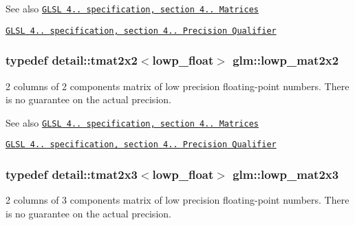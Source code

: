 \begin{DoxySeeAlso}{\-See also}
\href{http://www.opengl.org/registry/doc/GLSLangSpec.4.20.8.pdf}{\tt \-G\-L\-S\-L 4.. specification, section 4.. \-Matrices} 

\href{http://www.opengl.org/registry/doc/GLSLangSpec.4.20.8.pdf}{\tt \-G\-L\-S\-L 4.. specification, section 4.. \-Precision \-Qualifier} 
\end{DoxySeeAlso}
\hypertarget{group__core__precision_gae3f6c672d0fa47ece879f2b1cda7f22b}{
\subsubsection[{lowp\-\_\-mat2x2}]{\setlength{\rightskip}{0pt plus 5cm}typedef detail\-::tmat2x2$<$lowp\-\_\-float$>$ {\bf glm\-::lowp\-\_\-mat2x2}}}\label{group__core__precision_gae3f6c672d0fa47ece879f2b1cda7f22b}
2 columns of 2 components matrix of low precision floating-\/point numbers. \-There is no guarantee on the actual precision.

\begin{DoxySeeAlso}{\-See also}
\href{http://www.opengl.org/registry/doc/GLSLangSpec.4.20.8.pdf}{\tt \-G\-L\-S\-L 4.. specification, section 4.. \-Matrices} 

\href{http://www.opengl.org/registry/doc/GLSLangSpec.4.20.8.pdf}{\tt \-G\-L\-S\-L 4.. specification, section 4.. \-Precision \-Qualifier} 
\end{DoxySeeAlso}
\hypertarget{group__core__precision_ga094f5266f214da7ef32e49df6432f4fa}{
\subsubsection[{lowp\-\_\-mat2x3}]{\setlength{\rightskip}{0pt plus 5cm}typedef detail\-::tmat2x3$<$lowp\-\_\-float$>$ {\bf glm\-::lowp\-\_\-mat2x3}}}\label{group__core__precision_ga094f5266f214da7ef32e49df6432f4fa}
2 columns of 3 components matrix of low precision floating-\/point numbers. \-There is no guarantee on the actual precision.

